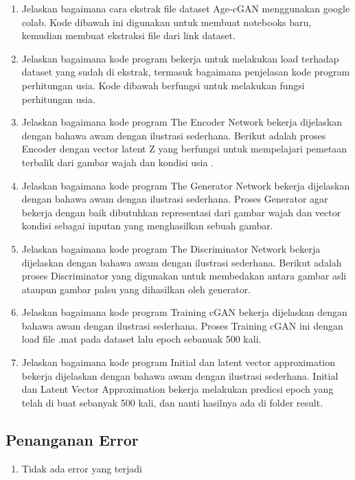     \begin{enumerate}
	\item Jelaskan bagaimana cara ekstrak ﬁle dataset Age-cGAN menggunakan google colab.
    Kode dibawah ini digunakan untuk membuat notebooks baru, kemudian membuat ekstraksi file dari link dataset.
	

	\item Jelaskan bagaimana kode program bekerja untuk melakukan load terhadap dataset yang sudah di ekstrak, termasuk bagaimana penjelasan kode program perhitungan usia.
    Kode dibawah berfungsi untuk melakukan fungsi perhitungan usia.
	

	\item Jelaskan bagaimana kode program The Encoder Network bekerja dijelaskan dengan bahawa awam dengan ilustrasi sederhana.
    Berikut adalah proses Encoder dengan vector latent Z yang berfungsi untuk mempelajari pemetaan terbalik dari gambar wajah dan kondisi usia .
	

	\item Jelaskan bagaimana kode program The Generator Network bekerja dijelaskan dengan bahawa awam dengan ilustrasi sederhana.
    Proses Generator agar bekerja dengan baik dibutuhkan representasi dari gambar wajah dan vector kondisi sebagai inputan yang menghasilkan sebuah gambar.
	

    \item Jelaskan bagaimana kode program The Discriminator Network bekerja dijelaskan dengan bahawa awam dengan ilustrasi sederhana.
    Berikut adalah proses Discriminator yang digunakan untuk membedakan antara gambar asli ataupun gambar palsu yang dihasilkan oleh generator.
	

    \item Jelaskan bagaimana kode program Training cGAN bekerja dijelaskan dengan bahawa awam dengan ilustrasi sederhana.
    Proses Training cGAN ini dengan load file .mat pada dataset lalu epoch sebanuak 500 kali.

	

    \item Jelaskan bagaimana kode program Initial dan latent vector approximation bekerja dijelaskan dengan bahawa awam dengan ilustrasi sederhana.
    Initial dan Latent Vector Approximation bekerja melakukan predicsi epoch yang telah di buat sebanyak 500 kali, dan nanti hasilnya ada di folder result.

	

\end{enumerate}

\subsection{Penanganan Error}
\begin{enumerate}
	\item Tidak ada error yang terjadi
\end{enumerate}



